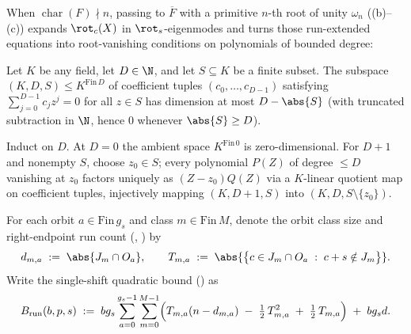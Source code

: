 When $\operatorname{char}(F) \nmid n$, passing to $\overline{F}$ with a primitive $n$-th root of unity
$\omega_n$ ((b)--(c)) expands $\rot_c(X)$ in $\rot_s$-eigenmodes and
turns those run-extended equations into root-vanishing conditions on polynomials of bounded degree:

\begin{lemma}\label{lem:vanish-coeffs}
Let $K$ be any field, let $D \in \N$, and let $S \subseteq K$ be a finite subset. The subspace
 $(K, D, S) \le K^{\mathrm{Fin}\,D}$ of coefficient tuples $(c_0, \dots, c_{D-1})$
satisfying $\sum_{j=0}^{D-1} c_j z^j = 0$ for all $z \in S$ has dimension at most $D - \abs{S}$
(with truncated subtraction in $\N$, hence $0$ whenever $\abs{S} \ge D$).
\end{lemma}
\begin{outline}
Induct on $D$. At $D = 0$ the ambient space $K^{\mathrm{Fin}\,0}$ is zero-dimensional. For $D + 1$
and nonempty $S$, choose $z_0 \in S$; every polynomial $P(Z)$ of degree $\le D$ vanishing at $z_0$
factors uniquely as $(Z - z_0) Q(Z)$ via a $K$-linear quotient map on coefficient tuples,
injectively mapping $(K, D + 1, S)$ into
$(K, D, S \setminus \{z_0\})$.
\end{outline}

For each orbit $a \in \mathrm{Fin}\,g_s$ and class $m \in \mathrm{Fin}\,M$, denote the orbit class size
and right-endpoint run count (, ) by
\[
  d_{m,a} \;:=\; \abs{J_m \cap O_a},
  \qquad
  T_{m,a} \;:=\; \abs{\bigl\{c \in J_m \cap O_a \;:\; c + s \notin J_m\bigr\}}.
\]
Write the single-shift quadratic bound () as
\[
  B_{\mathrm{run}}(b, p, s)
  \;:=\;
  b g_s \sum_{a=0}^{g_s - 1} \sum_{m=0}^{M - 1}
    \Bigl(T_{m,a}(n - d_{m,a}) \;-\; \tfrac{1}{2}\,T_{m,a}^2 \;+\; \tfrac{1}{2}\,T_{m,a}\Bigr)
  \;+\; b g_s d.
\]

